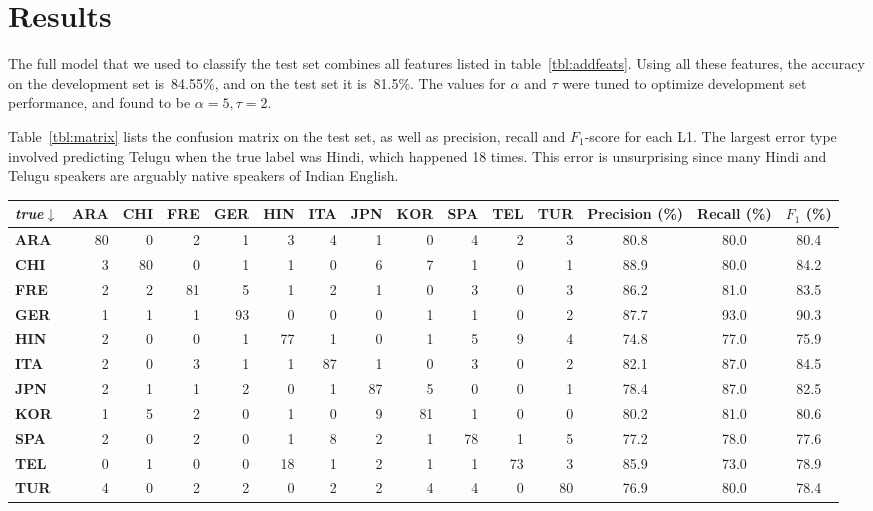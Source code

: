 \documentclass[11pt,letterpaper]{article}
\newcommand{\tref}[1]{table~\ref{#1}}
\newcommand{\Tref}[1]{Table~\ref{#1}}
\begin{document}
\section{Results}
\label{sec:results}
The full model that we used to classify the test set combines all
features listed in \tref{tbl:addfeats}. Using all these features, the
accuracy on the development set is~84.55\%, and on the test set it
is~81.5\%. The values for $\alpha$ and $\tau$ were tuned to optimize development set performance, and found to be $\alpha=5, \tau=2$.

\Tref{tbl:matrix} lists the confusion matrix on the test
set, as well as precision, recall and $F_1$-score for each L1.
The largest error type involved predicting Telugu when the true label 
was Hindi, which happened 18 times.  This error is unsurprising since many Hindi and Telugu speakers are arguably native speakers of Indian English.



\begin{table*}[hbt]
\small\centering
\begin{tabular}{>{\bf}l|r@{ }r@{ }r@{ }r@{ }r@{ }r@{ }r@{ }r@{ }r@{ }r@{ }r|ccc} %
\emph{true}$\downarrow$	& \bf ARA & \bf CHI & \bf FRE & \bf GER & \bf HIN & \bf ITA & \bf JPN & \bf KOR & \bf SPA & \bf TEL & \bf TUR & \bf Precision (\%) & \bf Recall (\%) & \bf $F_1$ (\%) \\
\hline
ARA & 80 & 0 & 2 & 1 & 3 & 4 & 1 & 0 & 4 & 2 & 3 & 80.8 & 80.0 & 80.4 \\
CHI & 3 & 80 & 0 & 1 & 1 & 0 & 6 & 7 & 1 & 0 & 1 & 88.9 & 80.0 & 84.2 \\
FRE & 2 & 2 & 81 & 5 & 1 & 2 & 1 & 0 & 3 & 0 & 3 & 86.2 & 81.0 & 83.5 \\
\hline
GER & 1 & 1 & 1 & 93 & 0 & 0 & 0 & 1 & 1 & 0 & 2 & 87.7 & 93.0 & 90.3 \\
HIN & 2 & 0 & 0 & 1 & 77 & 1 & 0 & 1 & 5 & 9 & 4 & 74.8 & 77.0 & 75.9 \\
ITA & 2 & 0 & 3 & 1 & 1 & 87 & 1 & 0 & 3 & 0 & 2 & 82.1 & 87.0 & 84.5 \\
\hline
JPN & 2 & 1 & 1 & 2 & 0 & 1 & 87 & 5 & 0 & 0 & 1 & 78.4 & 87.0 & 82.5 \\
KOR & 1 & 5 & 2 & 0 & 1 & 0 & 9 & 81 & 1 & 0 & 0 & 80.2 & 81.0 & 80.6 \\
SPA & 2 & 0 & 2 & 0 & 1 & 8 & 2 & 1 & 78 & 1 & 5 & 77.2 & 78.0 & 77.6 \\
\hline
TEL & 0 & 1 & 0 & 0 & 18 & 1 & 2 & 1 & 1 & 73 & 3 & 85.9 & 73.0 & 78.9 \\
TUR & 4 & 0 & 2 & 2 & 0 & 2 & 2 & 4 & 4 & 0 & 80 & 76.9 & 80.0 & 78.4 \\
\end{tabular}
\caption{Official test set confusion matrix with the full model. 
Accuracy is 81.5\%.}
\label{tbl:matrix}
\end{table*}
\end{document}
